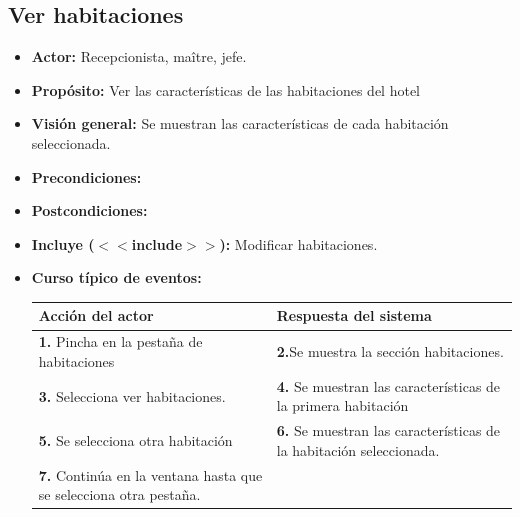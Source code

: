 \documentclass[spanish,a4paper,11pt, twoside]{report}	%
\begin{document}
	
	\hspace{-1.7 true cm}
	\subsection{Ver habitaciones}
		\begin{itemize}
			\item \textbf{Actor:} Recepcionista, maître, jefe.
			\item \textbf{Propósito: } Ver las características de las habitaciones del hotel
			\item \textbf{Visión general:} Se muestran las características de cada habitación seleccionada.
			\item \textbf{Precondiciones:} 
			\item \textbf{Postcondiciones:} 
			\item \textbf{Incluye ($<<$include$>>$):} Modificar habitaciones.
			\item \textbf{Curso típico de eventos:} 	\\
				\begin{tabular}{|p{6cm}||p{6cm}|}
				\hline
				\textbf{Acción del actor} & \textbf{Respuesta del sistema} \\ \hline
				\textbf{1.} Pincha en la pestaña de habitaciones & \textbf{2.}Se muestra la sección habitaciones.\\ \hline 
				\textbf{3.} Selecciona ver habitaciones. & \textbf{4.} Se muestran las características de la primera habitación  \\ \hline
				\textbf{5.} Se selecciona otra habitación & \textbf{6.} Se muestran las características de la habitación seleccionada. \\ \hline
				\textbf{7.} Continúa en la ventana hasta que se selecciona otra pestaña. & \\ \hline
			\end{tabular}
			\\
		\end {itemize}
		
\end{document}
